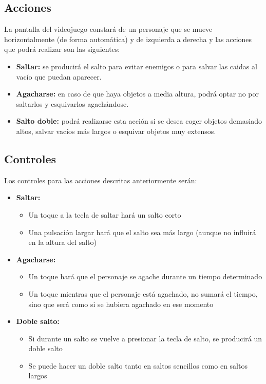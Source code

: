 \documentclass[palatino]{apuntes}
\begin{document}
\subsection{Acciones}
La pantalla del videojuego constará de un personaje que se mueve horizontalmente (de forma automática) y de izquierda a derecha y las acciones que podrá realizar son las siguientes:

\begin{itemize}
    \item \textbf{Saltar:} se producirá el salto para evitar enemigos o para salvar las caidas al vacío que puedan aparecer.
    \item \textbf{Agacharse:} en caso de que haya objetos a media altura, podrá optar no por saltarlos y esquivarlos agachándose.
    \item \textbf{Salto doble:} podrá realizarse esta acción si se desea coger objetos demasiado altos, salvar vacíos más largos o esquivar objetos muy extensos.
\end{itemize}


\subsection{Controles}
Los controles para las acciones descritas anteriormente serán:

\begin{itemize}
    \item \textbf{Saltar:}
        \begin{itemize}
            \item Un toque a la tecla de saltar hará un salto corto
            \item Una pulsación largar hará que el salto sea más largo (aunque no influirá en la altura del salto) 
        \end{itemize}
    \item \textbf{Agacharse:}
        \begin{itemize}
            \item Un toque hará que el personaje se agache durante un tiempo determinado
            \item Un toque mientras que el personaje está agachado, no sumará el tiempo, sino que será como si se hubiera agachado en ese momento
        \end{itemize}
    \item \textbf{Doble salto:}
        \begin{itemize}
            \item Si durante un salto se vuelve a presionar la tecla de salto, se producirá un doble salto
            \item Se puede hacer un doble salto tanto en saltos sencillos como en saltos largos
        \end{itemize}
\end{itemize}
\end{document}
